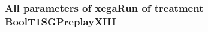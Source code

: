 \documentclass[18pt,c]{beamer}
\begin{document}

 \begin{frame}
 \fontsize{8pt}{9pt}\selectfont
 \frametitle{  All parameters of xegaRun of treatment BoolT1SGPreplayXIII 
 }

 \label{ExpCtParmTable021.tex}  
 \end{frame}

\end{document}
